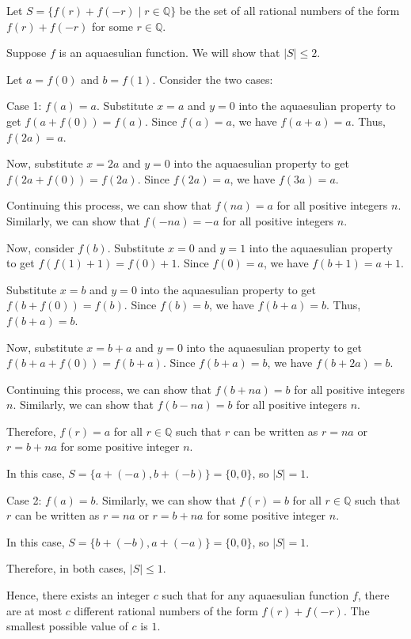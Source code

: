Let $S = \{f(r) + f(-r) \mid r \in \mathbb{Q}\}$ be the set of all rational numbers of the form $f(r) + f(-r)$ for some $r \in \mathbb{Q}$.

Suppose $f$ is an aquaesulian function. We will show that $|S| \leq 2$.

Let $a = f(0)$ and $b = f(1)$. Consider the two cases:

Case 1: $f(a) = a$.
Substitute $x = a$ and $y = 0$ into the aquaesulian property to get $f(a+f(0)) = f(a)$. Since $f(a) = a$, we have $f(a+a) = a$. Thus, $f(2a) = a$.

Now, substitute $x = 2a$ and $y = 0$ into the aquaesulian property to get $f(2a+f(0)) = f(2a)$. Since $f(2a) = a$, we have $f(3a) = a$.

Continuing this process, we can show that $f(na) = a$ for all positive integers $n$. Similarly, we can show that $f(-na) = -a$ for all positive integers $n$.

Now, consider $f(b)$. Substitute $x = 0$ and $y = 1$ into the aquaesulian property to get $f(f(1)+1) = f(0) + 1$. Since $f(0) = a$, we have $f(b+1) = a + 1$.

Substitute $x = b$ and $y = 0$ into the aquaesulian property to get $f(b+f(0)) = f(b)$. Since $f(b) = b$, we have $f(b+a) = b$. Thus, $f(b+a) = b$.

Now, substitute $x = b+a$ and $y = 0$ into the aquaesulian property to get $f(b+a+f(0)) = f(b+a)$. Since $f(b+a) = b$, we have $f(b+2a) = b$.

Continuing this process, we can show that $f(b+na) = b$ for all positive integers $n$. Similarly, we can show that $f(b-na) = b$ for all positive integers $n$.

Therefore, $f(r) = a$ for all $r \in \mathbb{Q}$ such that $r$ can be written as $r = na$ or $r = b + na$ for some positive integer $n$.

In this case, $S = \{a + (-a), b + (-b)\} = \{0, 0\}$, so $|S| = 1$.

Case 2: $f(a) = b$.
Similarly, we can show that $f(r) = b$ for all $r \in \mathbb{Q}$ such that $r$ can be written as $r = na$ or $r = b + na$ for some positive integer $n$.

In this case, $S = \{b + (-b), a + (-a)\} = \{0, 0\}$, so $|S| = 1$.

Therefore, in both cases, $|S| \leq 1$.

Hence, there exists an integer $c$ such that for any aquaesulian function $f$, there are at most $c$ different rational numbers of the form $f(r) + f(-r)$. The smallest possible value of $c$ is $1$.
